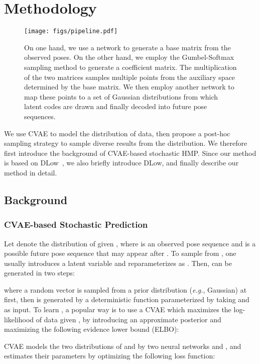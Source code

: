 \documentclass[sigconf,screen,nonacm]{acmart}
\begin{document}
	\section{Methodology}
	\begin{figure*}[!t]
		\centering
		\texttt{[image: figs/pipeline.pdf]}
		\caption{On one hand, we use a network  to generate a base matrix from the observed poses. On the other hand, we employ the Gumbel-Softmax sampling method to generate a coefficient matrix. The multiplication of the two matrices samples multiple points from the auxiliary space determined by the base matrix. We then employ another network  to map these points to a set of Gaussian distributions from which latent codes are drawn and finally decoded into future pose sequences.}
		\label{fig:pipeline}
	\end{figure*}
	
	We use CVAE to model the distribution of data, then propose a post-hoc sampling strategy to sample diverse results from the distribution. We therefore first introduce the background of CVAE-based stochastic HMP. Since our method is based on DLow~\cite{yuan2020dlow}, we also briefly introduce DLow, and finally describe our method in detail.
	
	\subsection{Background}
	
	\subsubsection{CVAE-based Stochastic Prediction}
	Let  denote the distribution of  given , where  is an observed pose sequence and  is a possible future pose sequence that may appear after . To sample  from , one usually introduces a latent variable  and reparameterizes  as . Then,  can be generated in two steps:
	
	where a random vector  is sampled from a prior distribution  (\textit{e.g.}, Gaussian) at first, then  is generated by a deterministic function  parameterized by  taking  and  as input. To learn , a popular way is to use a CVAE which maximizes the log-likelihood of data  given , by introducing an approximate posterior  and maximizing the following evidence lower bound (ELBO):
	
	CVAE models the two distributions of  and  by two neural networks  and , and estimates their parameters by optimizing the following loss function:
	
\end{document}

